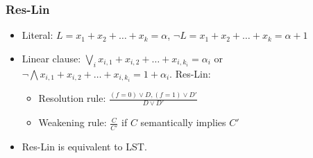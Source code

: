 \begin{frame}
    \frametitle{Res-Lin}

    \begin{itemize}
		\item Literal: $L = x_{1} + x_{2} + \dots + x_{k} = \alpha$,
    		$\lnot L = x_{1} + x_{2} + \dots + x_{k} = \alpha + 1$
		\item Linear clause: $\bigvee_i x_{i, 1} + x_{i, 2} + \dots + x_{i, k_i} =
		    \alpha_i$ or $\lnot \bigwedge x_{i, 1} + x_{i, 2} + \dots + x_{i, k_i} =
            1 + \alpha_i$. 
		\pitem Res-Lin:
			\begin{itemize}
				\item Resolution rule: $\frac{(f = 0) \lor D, (f = 1) \lor D'}
            		{D \lor D'}$ 
				\item Weakening rule: $\frac{C}{C'}$ if $C$ semantically implies $C'$
			\end{itemize}
		\item {} Res-Lin is equivalent to LST.
	\end{itemize}
\end{frame}



